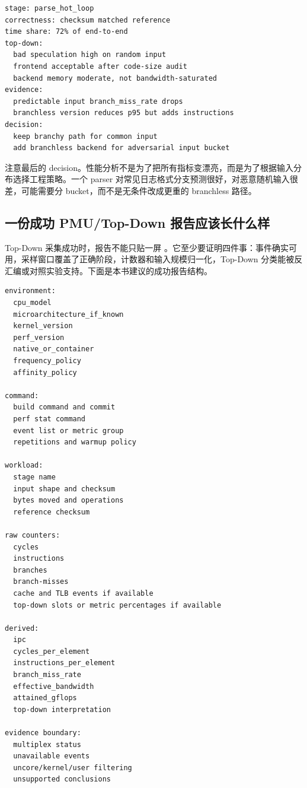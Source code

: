 \begin{lstlisting}[numbers=none,caption={一个热循环报告的 top-down 叙述模板}]
stage: parse_hot_loop
correctness: checksum matched reference
time share: 72% of end-to-end
top-down:
  bad speculation high on random input
  frontend acceptable after code-size audit
  backend memory moderate, not bandwidth-saturated
evidence:
  predictable input branch_miss_rate drops
  branchless version reduces p95 but adds instructions
decision:
  keep branchy path for common input
  add branchless backend for adversarial input bucket
\end{lstlisting}

注意最后的 decision。性能分析不是为了把所有指标变漂亮，而是为了根据输入分布选择工程策略。一个 parser 对常见日志格式分支预测很好，对恶意随机输入很差，可能需要分 bucket，而不是无条件改成更重的 branchless 路径。

\subsection{一份成功 PMU/Top-Down 报告应该长什么样}

Top-Down 采集成功时，报告不能只贴一屏 。它至少要证明四件事：事件确实可用，采样窗口覆盖了正确阶段，计数器和输入规模归一化，Top-Down 分类能被反汇编或对照实验支持。下面是本书建议的成功报告结构。

\begin{lstlisting}[numbers=none,caption={PMU/Top-Down 成功报告字段}]
environment:
  cpu_model
  microarchitecture_if_known
  kernel_version
  perf_version
  native_or_container
  frequency_policy
  affinity_policy

command:
  build command and commit
  perf stat command
  event list or metric group
  repetitions and warmup policy

workload:
  stage name
  input shape and checksum
  bytes moved and operations
  reference checksum

raw counters:
  cycles
  instructions
  branches
  branch-misses
  cache and TLB events if available
  top-down slots or metric percentages if available

derived:
  ipc
  cycles_per_element
  instructions_per_element
  branch_miss_rate
  effective_bandwidth
  attained_gflops
  top-down interpretation

evidence boundary:
  multiplex status
  unavailable events
  uncore/kernel/user filtering
  unsupported conclusions
\end{lstlisting}

